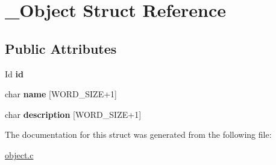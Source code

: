 \hypertarget{struct__Object}{}\section{\+\_\+\+Object Struct Reference}
\label{struct__Object}
\subsection*{Public Attributes}
\begin{DoxyCompactItemize}
\item 
\mbox{\label{struct__Object_a3cff7a0e8dc4e9d23895ed9af1b7653a}} 
Id {\bfseries id}
\item 
\mbox{\label{struct__Object_a03fb9b8d91f071e8e30d669be79cc040}} 
char {\bfseries name} \mbox{[}W\+O\+R\+D\+\_\+\+S\+I\+ZE+1\mbox{]}
\item 
\mbox{\label{struct__Object_add691deed525492ad692cc2f5bccfe90}} 
char {\bfseries description} \mbox{[}W\+O\+R\+D\+\_\+\+S\+I\+ZE+1\mbox{]}
\end{DoxyCompactItemize}


The documentation for this struct was generated from the following file\+:\begin{DoxyCompactItemize}
\item 
\hyperlink{object_8c}{object.\+c}\end{DoxyCompactItemize}
